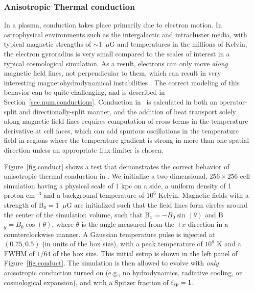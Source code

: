 \subsubsection{Anisotropic Thermal conduction}
\label{sec.tests.conduct}

In a plasma, conduction takes place primarily due to electron motion.
In astrophysical environments such as the intergalactic and
intracluster media, with typical magnetic strengths of $\sim 1$~$\mu$G
and temperatures in the millions of Kelvin, the electron gyroradius is
very small compared to the scales of interest in a typical
cosmological simulation.  As a result, electrons can only move
\textit{along} magnetic field lines, not perpendicular to them, which
can result in very interesting magnetohydrodynamical instabilities \protect \citep[e.g.,][]{2008ApJ...677L...9P,2008ApJ...688..905P}. The correct
modeling of this behavior can be quite challenging, and is described
in Section~\protect\ref{sec.num.conductions}. Conduction in \protect\enzo\ is calculated in both an operator-split and directionally-split manner,
and the addition of heat transport solely along magnetic field lines
requires computation of cross-terms in the temperature derivative at
cell faces, which can add spurious oscillations in the temperature
field in regions where the temperature gradient is strong in more than
one spatial direction unless an appropriate flux-limiter \protect\citep[such as that of][]{1977JCoPh..23..263V} is chosen.

Figure~\ref{fig.conduct} shows a test that demonstrates the correct
behavior of anisotropic thermal conduction in \enzo.  We initialize a
two-dimensional, $256 \times 256$ cell simulation having a physical
scale of 1 kpc on a side, a uniform density of 1 proton cm$^{-3}$ and a
background temperature of $10^6$ Kelvin.  Magnetic fields with a
strength of B$_0 = 1$~$\mu$G are initialized such that the field lines
form circles around the center of the simulation volume, such that
B$_x = -B_0\sin(\theta)$ and B$_y = B_0\cos(\theta)$, where $\theta$
is the angle measured from the $+x$ direction in a counterclockwise
manner.  A Gaussian temperature pulse is injected at $(0.75, 0.5)$ (in
units of the box size), with a peak temperature of $10^8$ K and a FWHM
of $1/64$ of the box size.  This initial setup is shown in the left
panel of Figure~\ref{fig.conduct}.  The simulation is then allowed to
evolve with \textit{only} anisotropic conduction turned on (e.g., no
hydrodynamics, radiative cooling, or cosmological expansion), and with
a Spitzer fraction of f$_{\rm sp} = 1$.

